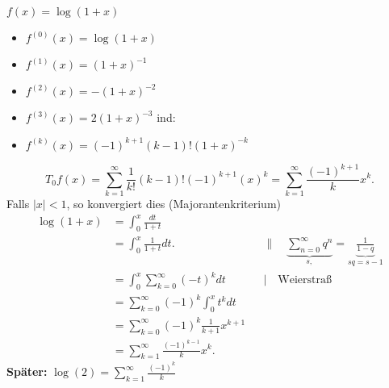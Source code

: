 \begin{subexample}
	$ f(x) = \log (1 + x) $ 
	\begin{itemize}
		\item $ f^{(0)} (x) = \log (1 + x) $
		\item $ f^{(1)} (x) = (1 + x)^{-1}  $
		\item $ f^{(2)} (x) = -(1 + x)^{-2}  $
		\item $ f^{(3)} (x) = 2(1 + x)^{-3}  $ ind:
		\item $ f^{(k)} (x) = (-1)^{k+1} (k-1)!(1 + x)^{-k}  $
	\end{itemize}
	\[
		T_0 f(x) = \sum_{k=1}^{\infty} \frac{ 1 }{ k! } (k-1)! (-1)^{k + 1}  (x)^k = \sum_{k=1}^{\infty} \frac{ (-1)^{k + 1}  }{ k } x^k. 
	\]
	Falls $ \left| x \right| < 1 $, so konvergiert dies (Majorantenkriterium)
	\begin{align*}
		\log (1 + x) &= \int_{0}^{x} \frac{ dt }{ 1 + t } \\
		~ &= \int_{0}^{x} \frac{ 1 }{ 1 + t } dt. &&\| \quad \underbrace{\sum_{n=0}^{\infty} q^n}_{s, } = \underbrace{\frac{ 1 }{ 1 - q } }_{sq = s - 1} \\
		~ &= \int_{0}^{x} \sum_{k=0}^{\infty} ( -t )^k dt &&| \quad \text{Weierstraß} \\
		~ &= \sum_{k=0}^{\infty} (-1)^k \int_{0}^{x}t^k dt \\
		~ &= \sum_{k=0}^{\infty} (-1)^{k} \frac{ 1 }{ k+1 } x^{k+1}  \\
		~ &= \sum_{k=1}^{\infty} \frac{ (-1)^{k-1}  }{ k }x^k.
	\end{align*}
	\textbf{Später:} $ \log (2) = \sum_{k=1}^{\infty} \frac{ (-1)^k }{ k }  $
\end{subexample}

